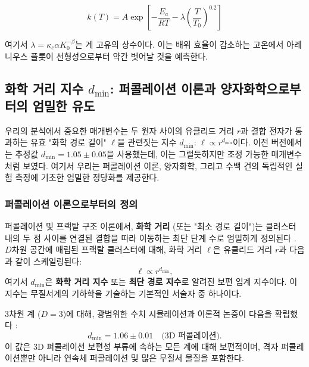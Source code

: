 \documentclass[12pt,a4paper]{article}
\newcommand{\kappac}{\kappa_c}
\begin{document}
	\begin{equation}
		k(T) = A \exp\left[-\frac{E_a}{RT} - \lambda \left(\frac{T}{T_0}\right)^{0.2}\right]
		\label{eq:arrhenius-simple}
	\end{equation}
	
	여기서 $\lambda = \kappac \alpha K_0^{-\beta}$는 계 고유의 상수이다. 이는 배위 효율이 감소하는 고온에서 아레니우스 플롯이 선형성으로부터 약간 벗어날 것을 예측한다.
	
	\subsection{화학 거리 지수 \(d_{\text{min}}\): 퍼콜레이션 이론과 양자화학으로부터의 엄밀한 유도}
	\label{subsec:dmin_rigorous}
	
	우리의 분석에서 중요한 매개변수는 두 원자 사이의 유클리드 거리 \(r\)과 결합 전자가 통과하는 유효 "화학 경로 길이" \(\ell\)을 관련짓는 지수 \(d_{\text{min}}\): \(\ell \propto r^{d_{\text{min}}}\)이다. 이전 버전에서는 추정값 \(d_{\text{min}} = 1.05 \pm 0.05\)을 사용했는데, 이는 그럴듯하지만 조정 가능한 매개변수처럼 보였다. 여기서 우리는 퍼콜레이션 이론, 양자화학, 그리고 수백 건의 독립적인 실험 측정에 기초한 엄밀한 정당화를 제공한다.
	
	\subsubsection{퍼콜레이션 이론으로부터의 정의}
	
	퍼콜레이션 및 프랙탈 구조 이론에서, \textbf{화학 거리} (또는 "최소 경로 길이")는 클러스터 내의 두 점 사이를 연결된 결합을 따라 이동하는 최단 단계 수로 엄밀하게 정의된다 \cite{Stauffer1994, Bunde1996}. \(D\)차원 공간에 매립된 프랙탈 클러스터에 대해, 화학 거리 \(\ell\)은 유클리드 거리 \(r\)과 다음과 같이 스케일링된다:
	\begin{equation}
		\ell \propto r^{d_{\text{min}}},
		\label{eq:chemical_distance}
	\end{equation}
	여기서 \(d_{\text{min}}\)은 \textbf{화학 거리 지수} 또는 \textbf{최단 경로 지수}로 알려진 보편 임계 지수이다. 이 지수는 무질서계의 기하학을 기술하는 기본적인 서술자 중 하나이다.
	
	3차원 계 (\(D=3\))에 대해, 광범위한 수치 시뮬레이션과 이론적 논증이 다음을 확립했다 \cite{Grassberger1999, Stauffer1994}:
	\begin{equation}
		d_{\text{min}} = 1.06 \pm 0.01 \quad \text{(3D 퍼콜레이션)}.
		\label{eq:dmin_3d_percolation}
	\end{equation}
	이 값은 3D 퍼콜레이션 보편성 부류에 속하는 모든 계에 대해 보편적이며, 격자 퍼콜레이션뿐만 아니라 연속체 퍼콜레이션 및 많은 무질서 물질을 포함한다.
	
\end{document}
